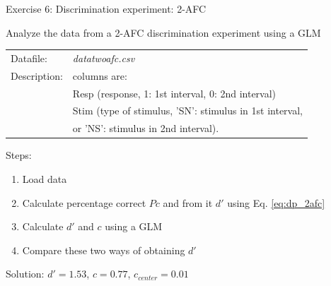 \documentclass[10pt]{beamer}
\begin{document}
\begin{frame}[fragile]{Exercise 6: Discrimination experiment: 2-AFC}

Analyze the data from a 2-AFC discrimination experiment using a GLM

\begin{tabular}{ll}
Datafile: & \textit{datatwoafc.csv}\\
Description: & columns are: \\
& Resp (response, 1: 1st interval, 0: 2nd interval)\\
& Stim (type of stimulus, 'SN': stimulus in 1st interval, \\
& or 'NS': stimulus in 2nd interval).
\end{tabular}

\vspace{10pt}


Steps:
\begin{enumerate}
\item Load data
\item Calculate percentage correct $Pc$ and from it $d'$ using Eq. \autoref{eq:dp_2afc}
\item Calculate $d'$ and $c$ using a GLM
\item Compare these two ways of obtaining $d'$
\end{enumerate}

\pause
\begin{center}
Solution: $d' = 1.53$, $c=0.77$, $c_{center} = 0.01$
\end{center}
\end{frame}



\end{document}
